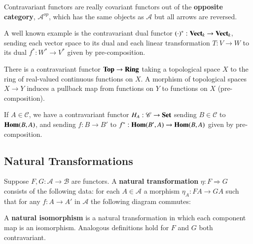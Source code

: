 Contravariant functors are really covariant functors out of the \textbf{opposite category}, $\mathscr{A}^{op}$, which has the same objects as $\mathscr{A}$ but all arrows are reversed.

\begin{example}
    A well known example is the contravariant dual functor $(\cdot)^*:\normalfont\textbf{Vect}_{k}\rightarrow \normalfont\textbf{Vect}_{k}$, sending each vector space to its dual and each linear transformation $T:V\rightarrow W$ to its dual $f^*:W^*\rightarrow V^*$ given by pre-composition.
\end{example}

\begin{example}
    There is a contravariant functor $\normalfont\textbf{Top}\rightarrow \normalfont\textbf{Ring}$ taking a topological space $X$ to the ring of real-valued continuous functions on $X$. A morphism of topological spaces $X\rightarrow Y$ induces a pullback map from functions on $Y$ to functions on $X$ (pre-composition).
\end{example}

\begin{example}
    If $A \in \mathscr{C}$, we have a contravariant functor $H_A:\mathscr{C}\rightarrow \normalfont\textbf{Set}$ sending $B \in \mathscr{C}$ to $\mathbf{Hom}(B,A)$, and sending $f:B\rightarrow B'$ to $f^*:\mathbf{Hom}(B',A)\rightarrow \mathbf{Hom}(B,A)$ given by pre-composition.
\end{example}

\subsection{Natural Transformations}

Suppose $F,G:\mathscr{A}\rightarrow \mathscr{B}$ are functors. A \textbf{natural transformation} $\eta:F\Rightarrow G$ consists of the following data: for each $A \in \mathscr{A}$ a morphism $\eta_A:FA\rightarrow GA$ such that for any $f:A\rightarrow A'$ in $\mathscr{A}$ the following diagram commutes:
\begin{center}
\end{center}
A \textbf{natural isomorphism} is a natural transformation in which each component map is an isomorphism. Analogous definitions hold for $F$ and $G$ both contravariant.

